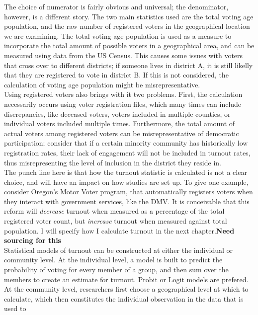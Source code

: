 \documentclass[12pt,twoside]{reedthesis}
\begin{document}
  The choice of numerator is fairly obvious and universal; the
  denominator, however, is a different story. The two main statistics used
  are the total voting age population, and the raw number of registered
  voters in the geographical location we are examining. The total voting
  age population is used as a measure to incorporate the total amount of
  possible voters in a geographical area, and can be measured using data
  from the US Census. This causes some issues with voters that cross over
  to different districts; if someone lives in district A, it is still
  likelly that they are registered to vote in district B. If this is not
  considered, the calculation of voting age population might be
  misrepresentative.\\
  Using registered voters also brings with it two problems. First, the
  calculation necessarily occurs using voter registration files, which
  many times can include discrepancies, like deceased voters, voters
  included in multiple counties, or individual voters included multiple
  times. Furthermore, the total amount of actual voters among registered
  voters can be misrepresentative of democratic participation; consider
  that if a certain minority community has historically low registration
  rates, their lack of engagement will not be included in turnout rates,
  thus misrepresenting the level of inclusion in the district they reside
  in.\\
  The punch line here is that how the turnout statistic is calculated is
  not a clear choice, and will have an impact on how studies are set up.
  To give one example, consider Oregon's Motor Voter program, that
  automatically registers voters when they interact with government
  services, like the DMV. It is conceivable that this reform will
  \emph{decrease} turnout when measured as a percentage of the total
  registered voter count, but \emph{increase} turnout when measured
  against total population. I will specify how I calculate turnout in the
  next chapter.\textbf{Need sourcing for this}\\
  Statistical models of turnout can be constructed at either the
  individual or community level. At the individual level, a model is built
  to predict the probability of voting for every member of a group, and
  then sum over the members to create an estimate for turnout. Probit or
  Logit models are prefered. At the community level, researchers first
  choose a geographical level at which to calculate, which then
  constitutes the individual observation in the data that is used to
\end{document}
